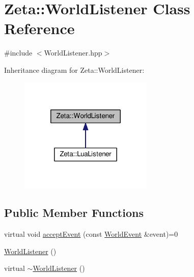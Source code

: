 \hypertarget{classZeta_1_1WorldListener}{\section{Zeta\+:\+:World\+Listener Class Reference}
\label{classZeta_1_1WorldListener}
}


{\ttfamily \#include $<$World\+Listener.\+hpp$>$}



Inheritance diagram for Zeta\+:\+:World\+Listener\+:\nopagebreak
\begin{figure}[H]
\begin{center}
\leavevmode
\includegraphics[width=180pt]{classZeta_1_1WorldListener__inherit__graph}
\end{center}
\end{figure}
\subsection*{Public Member Functions}
\begin{DoxyCompactItemize}
\item 
virtual void \hyperlink{classZeta_1_1WorldListener_a8a8236575671cb7cd40c5e7eb6991080}{accept\+Event} (const \hyperlink{classZeta_1_1WorldEvent}{World\+Event} \&event)=0
\item 
\hyperlink{classZeta_1_1WorldListener_a0a24b040c39f598500b7a8ffc01a505f}{World\+Listener} ()
\item 
virtual \hyperlink{classZeta_1_1WorldListener_ab5aa637b6b2a081de173d0a9950c6375}{$\sim$\+World\+Listener} ()
\end{DoxyCompactItemize}


